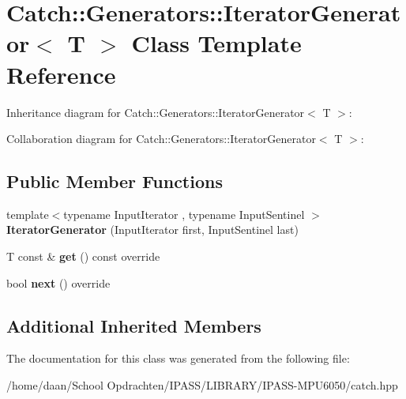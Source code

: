 \hypertarget{classCatch_1_1Generators_1_1IteratorGenerator}{}\section{Catch\+:\+:Generators\+:\+:Iterator\+Generator$<$ T $>$ Class Template Reference}
\label{classCatch_1_1Generators_1_1IteratorGenerator}


Inheritance diagram for Catch\+:\+:Generators\+:\+:Iterator\+Generator$<$ T $>$\+:


Collaboration diagram for Catch\+:\+:Generators\+:\+:Iterator\+Generator$<$ T $>$\+:
\subsection*{Public Member Functions}
\begin{DoxyCompactItemize}
\item 
\mbox{\label{classCatch_1_1Generators_1_1IteratorGenerator_a1f795b1bbd515274673115c0a9fc2e54}} 
{\footnotesize template$<$typename Input\+Iterator , typename Input\+Sentinel $>$ }\\{\bfseries Iterator\+Generator} (Input\+Iterator first, Input\+Sentinel last)
\item 
\mbox{\label{classCatch_1_1Generators_1_1IteratorGenerator_a61688118e5caba23340b4b949c3bb7e4}} 
T const  \& {\bfseries get} () const override
\item 
\mbox{\label{classCatch_1_1Generators_1_1IteratorGenerator_acafb4fa1eebe5e1db571621a35a3f137}} 
bool {\bfseries next} () override
\end{DoxyCompactItemize}
\subsection*{Additional Inherited Members}


The documentation for this class was generated from the following file\+:\begin{DoxyCompactItemize}
\item 
/home/daan/\+School Opdrachten/\+I\+P\+A\+S\+S/\+L\+I\+B\+R\+A\+R\+Y/\+I\+P\+A\+S\+S-\/\+M\+P\+U6050/catch.\+hpp\end{DoxyCompactItemize}
